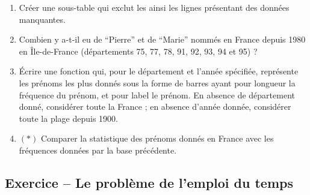 \documentclass{article}
\newcounter{loop}
\newcounter{numEx}
\newcommand{\exo}[1]{
	\stepcounter{numEx}
	\setcounter{loop}{0}
	\subsection*{Exercice \arabic{numEx} -- #1}
}
\begin{document}
\begin{enumerate}[resume]
	\item Créer une sous-table qui exclut les  ainsi les lignes présentant des données manquantes.
	\item Combien y a-t-il eu de ``Pierre'' et de ``Marie'' nommés en France depuis 1980 en Île-de-France (départements 75, 77, 78, 91, 92, 93, 94 et 95) ?
	\item Écrire une fonction  qui, pour le département et l'année spécifiée, représente les  prénoms les plus donnés sous la forme de barres ayant pour longueur la fréquence du prénom, et pour label le prénom. En absence de département donné, considérer toute la France ; en absence d'année donnée, considérer toute la plage depuis 1900.
	\item $(*)$ Comparer la statistique des prénoms donnés en France avec les fréquences données par la base précédente.
\end{enumerate}

\exo{Le problème de l'emploi du temps}
\end{document}
